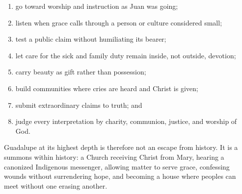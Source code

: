 \begin{enumerate}
  \item go toward worship and instruction as Juan was going;
  \item listen when grace calls through a person or culture considered small;
  \item test a public claim without humiliating its bearer;
  \item let care for the sick and family duty remain inside, not outside, devotion;
  \item carry beauty as gift rather than possession;
  \item build communities where cries are heard and Christ is given;
  \item submit extraordinary claims to truth; and
  \item judge every interpretation by charity, communion, justice, and worship of God.
\end{enumerate}

Guadalupe at its highest depth is therefore not an escape from history. It is a summons within history: a Church receiving Christ from Mary, hearing a canonized Indigenous messenger, allowing matter to serve grace, confessing wounds without surrendering hope, and becoming a house where peoples can meet without one erasing another.

